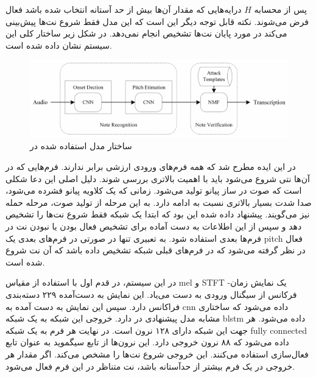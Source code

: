 پس از محسابه $H$ درایه‌هایی که مقدار آن‌ها بیش از حد آستانه انتخاب شده باشد فعال
فرض می‌شوند. نکته قابل توجه دیگر این است که این مدل فقط شروع نت‌ها پیش‌بینی
می‌کند در مورد پایان نت‌ها تشخیص انجام نمی‌دهد. در شکل زیر ساختار کلی این سیستم
نشان داده شده است.
\begin{figure}[ht]
    \centering
    \includegraphics[width=12cm]{./statics/wang2017two_architecture.png}
    \caption{ساختار مدل استفاده شده در \cite{wang2017two}}
\end{figure}

در \cite{hawthorne2017onsets} این ایده مطرح شد که همه فرم‌‌های ورودی ارزشی برابر
ندارند. فرم‌هایی که در آن‌ها نتی شروع می‌شود باید با اهمیت بالاتری بررسی شوند.
دلیل اصلی این دعا شکلی است که صوت در ساز پیانو تولید می‌شود. زمانی که یک کلاویه
پیانو فشرده می‌شود، صدا شدت بسیار بالاتری نسبت به ادامه دارد. به این مرحله از
تولید صوت، مرحله حمله نیز می‌گویند. پیشنهاد داده شده این بود که ابتدا یک شبکه
فقط شروع نت‌ها را تشخیص دهد و سپس از این اطلاعات به دست آماده برای تشخیص فعال
بودن یا نبودن نت‌ در فرم‌ها بعدی استفاده شود. به تعبیری تنها در صورتی در فرم‌های
بعدی یک \gls{pitch} فعال در نظر گرفته می‌شود که در فرم‌های قبلی شبکه تشخیص داده
باشد که آن نت شروع شده است.

در این سیستم، در قدم اول با استفاده از مقیاس mel و \gls{STFT} یک نمایش
زمان-فرکانس از سیگنال ورودی به دست می‌یاد. این نمایش به دست‌آمده ۲۲۹ دسته‌بندی
فراکانس دارد. سپس این نمایش به دست آمده به \gls{cnn} داده می‌شود که ساختاری
مشابه مدل پیشنهادی در \cite{kelz2016potential} دارد. خروجی این شبکه به یک شبکه
\gls{blstm} داده می‌شود. هر جهت این شبکه دارای ۱۲۸ نرون است. در نهایت هر فرم به
یک شبکه \gls{fully connected} داده می‌شود که ۸۸ نرون خروجی دارد. این نرون‌ها از
تابع سیگموید به عنوان تابع فعال‌سازی استفاده می‌کنند. این خروجی شروع نت‌ها را
مشخص می‌کند. اگر مقدار هر خروجی در یک فرم بیشتر از حدآستانه باشد، نت متناظر در
این فرم فعال می‌شود.

